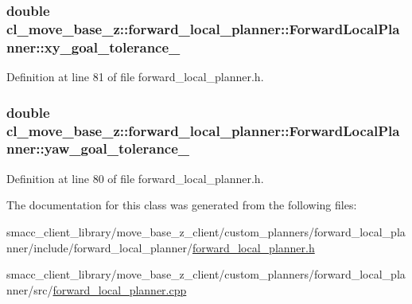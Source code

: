\subsubsection[{\texorpdfstring{xy\+\_\+goal\+\_\+tolerance\+\_\+}{xy_goal_tolerance_}}]{\setlength{\rightskip}{0pt plus 5cm}double cl\+\_\+move\+\_\+base\+\_\+z\+::forward\+\_\+local\+\_\+planner\+::\+Forward\+Local\+Planner\+::xy\+\_\+goal\+\_\+tolerance\+\_\+\hspace{0.3cm}{\ttfamily [private]}}\hypertarget{classcl__move__base__z_1_1forward__local__planner_1_1ForwardLocalPlanner_acd2ed91ee166f03faeeb9d6a4b91084b}{}\label{classcl__move__base__z_1_1forward__local__planner_1_1ForwardLocalPlanner_acd2ed91ee166f03faeeb9d6a4b91084b}


Definition at line 81 of file forward\+\_\+local\+\_\+planner.\+h.

\subsubsection[{\texorpdfstring{yaw\+\_\+goal\+\_\+tolerance\+\_\+}{yaw_goal_tolerance_}}]{\setlength{\rightskip}{0pt plus 5cm}double cl\+\_\+move\+\_\+base\+\_\+z\+::forward\+\_\+local\+\_\+planner\+::\+Forward\+Local\+Planner\+::yaw\+\_\+goal\+\_\+tolerance\+\_\+\hspace{0.3cm}{\ttfamily [private]}}\hypertarget{classcl__move__base__z_1_1forward__local__planner_1_1ForwardLocalPlanner_a7ea1ca266850c7b847a2355f489e6041}{}\label{classcl__move__base__z_1_1forward__local__planner_1_1ForwardLocalPlanner_a7ea1ca266850c7b847a2355f489e6041}


Definition at line 80 of file forward\+\_\+local\+\_\+planner.\+h.



The documentation for this class was generated from the following files\+:\begin{DoxyCompactItemize}
\item 
smacc\+\_\+client\+\_\+library/move\+\_\+base\+\_\+z\+\_\+client/custom\+\_\+planners/forward\+\_\+local\+\_\+planner/include/forward\+\_\+local\+\_\+planner/\hyperlink{forward__local__planner_8h}{forward\+\_\+local\+\_\+planner.\+h}\item 
smacc\+\_\+client\+\_\+library/move\+\_\+base\+\_\+z\+\_\+client/custom\+\_\+planners/forward\+\_\+local\+\_\+planner/src/\hyperlink{forward__local__planner_8cpp}{forward\+\_\+local\+\_\+planner.\+cpp}\end{DoxyCompactItemize}
